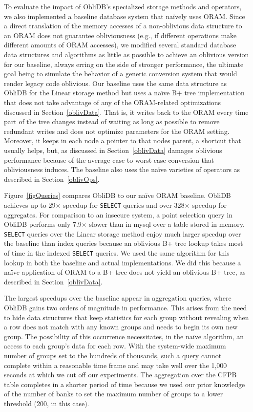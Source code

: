 \documentclass[letterpaper,twocolumn,10pt]{article}
\def\name/{ObliDB}
\begin{document}
To evaluate the impact of \name/'s specialized storage methods and operators, we also implemented a baseline database system that na\"ively uses ORAM. Since a direct translation of the memory accesses of a non-oblivious data structure to an ORAM does not guarantee obliviousness (e.g., if different operations make different amounts of ORAM accesses), we modified several standard database data structures and algorithms as little as possible to achieve an oblivious version for our baseline, always erring on the side of stronger performance, the ultimate goal being to simulate the behavior of a generic conversion system that would render legacy code oblivious. Our baseline uses the same data structure as \name/ for the Linear storage method but uses a na\"ive B+ tree implementation that does not take advantage of any of the ORAM-related optimizations discussed in Section~\ref{oblivData}. That is, it writes back to the ORAM every time part of the tree changes instead of waiting as long as possible to remove redundant writes and does not optimize parameters for the ORAM setting. Moreover, it keeps in each node a pointer to that nodes parent, a shortcut that usually helps, but, as discussed in Section~\ref{oblivData} damages oblivious performance because of the average case to worst case conversion that obliviousness induces. The baseline also uses the na\"ive varieties of operators as described in Section~\ref{oblivOps}.

Figure~\ref{figQueries} compares \name/ to our na\"ive ORAM baseline. \name/ achieves up to 29$\times$ speedup for \texttt{SELECT} queries and over 328$\times$ speedup for aggregates. For comparison to an insecure system, a point selection query in \name/ performs only 7.9$\times$ slower than in mysql over a table stored in memory. \texttt{SELECT} queries over the Linear storage method enjoy much larger speedup over the baseline than index queries because an oblivious B+ tree lookup takes most of time in the indexed \texttt{SELECT} queries. We used the same algorithm for this lookup in both the baseline and actual implementations. We did this because a na\"ive application of ORAM to a B+ tree does not yield an oblivious B+ tree, as described in Section~\ref{oblivData}.

The largest speedups over the baseline appear in aggregation queries, where \name/ gains two orders of magnitude in performance. This arises from the need to hide data structures that keep statistics for each group without revealing when a row does not match with any known groups and needs to begin its own new group. The possibility of this occurrence necessitates, in the na\"ive algorithm, an access to each group's data for each row. With the system-wide maximum number of groups set to the hundreds of thousands, such a query cannot complete within a reasonable time frame and may take well over the 1,000 seconds at which we cut off our experiments. The aggregation over the CFPB table completes in a shorter period of time because we used our prior knowledge of the number of banks to set the maximum number of groups to a lower threshold (200, in this case).
\end{document}
